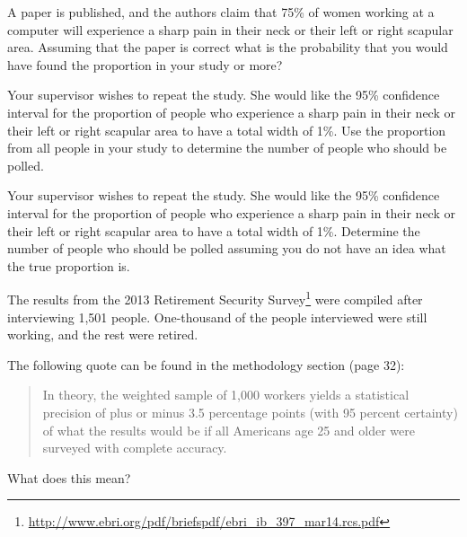 \begin{problem}
\begin{subproblem}
  \item A paper is published, and the authors claim that 75\% of women
    working at a computer will experience a sharp pain in their neck
    or their left or right scapular area. Assuming that the paper is
    correct what is the probability that you would have found the
    proportion in your study or more?

    \vfill

    \clearpage

  \item Your supervisor wishes to repeat the study. She would like the
    95\% confidence interval for the proportion of people who
    experience a sharp pain in their neck or their left or right
    scapular area to have a total width of 1\%. Use the proportion
    from all people in your study to determine the number of people
    who should be polled.

    \vfill

  \item Your supervisor wishes to repeat the study. She would like the
    95\% confidence interval for the proportion of people who
    experience a sharp pain in their neck or their left or right
    scapular area to have a total width of 1\%. Determine the number
    of people who should be polled assuming you do not have an idea
    what the true proportion is.


    \vfill

  \end{subproblem}

  \clearpage

\item The results from the 2013 Retirement Security
  Survey\footnote{\url{http://www.ebri.org/pdf/briefspdf/ebri_ib_397_mar14.rcs.pdf}}
  were compiled after interviewing 1,501 people. One-thousand of the
  people interviewed were still working, and the rest were retired. 
  \begin{subproblem}
  \item The following quote can be found in the methodology section
    (page 32):
    \begin{quote}
      In theory, the weighted sample of 1,000 workers yields a
      statistical precision of plus or minus 3.5 percentage points
      (with 95 percent certainty) of what the results would be if all
      Americans age 25 and older were surveyed with complete accuracy.
    \end{quote}
    What does this mean?


\end{subproblem}
\end{problem}
